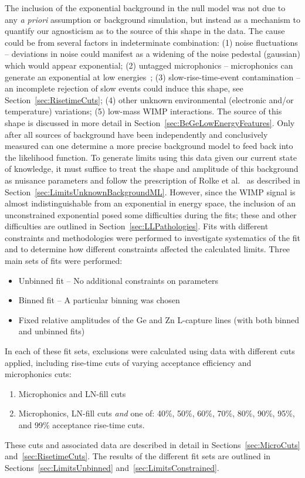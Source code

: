 The inclusion of the exponential background in the null model was not due to any \emph{a priori} assumption or background simulation, but instead as a mechanism to quantify our agnosticism as to the source of 
this shape in %
the data.  The cause could be from several factors in indeterminate combination: (1) noise fluctuations -- deviations in noise could manifest as a widening of the noise pedestal (gaussian) which would appear exponential; (2) untagged microphonics -- microphonics can generate an exponential at low energies~\cite{Morales1992410}; (3) slow-rise-time-event contamination -- an incomplete rejection of slow events could induce this shape, see Section~\ref{sec:RisetimeCuts}; (4) other unknown environmental (electronic and/or temperature) variations; (5) low-mass WIMP interactions.  The source of this shape is discussed in more detail in Section~\ref{sec:BeGeLowEnergyFeatures}.  Only after all sources of background have been independently and conclusively measured can one determine a more precise background model to feed back into the likelihood function.  To generate limits using this data given our current state of knowledge, it must suffice to treat the shape and amplitude of this background as nuisance parameters and follow the prescription of Rolke et al.~\cite{Rol05} as described in Section~\ref{sec:LimitsUnknownBackgroundML}.  However, since the WIMP signal is almost indistinguishable from an exponential in energy space, the inclusion of an unconstrained exponential posed some difficulties during the fits; these and other difficulties are outlined in Section~\ref{sec:LLPathologies}.
Fits with different constraints and methodologies were performed to investigate systematics of the fit and to determine how different constraints affected the calculated limits.  Three main sets of fits were performed:
		\begin{itemize}
			\item Unbinned fit -- No additional constraints on parameters
			\item Binned fit -- A particular binning was chosen
			\item Fixed relative amplitudes of the Ge and Zn L-capture lines (with both binned and unbinned fits)
		\end{itemize}			
In each of these fit sets, exclusions were calculated using data with different cuts applied, including rise-time cuts of varying acceptance efficiency and microphonics cuts:
	\begin{enumerate}	
		\item Microphonics and LN-fill cuts
		\item Microphonics, LN-fill cuts \emph{and} one of: 40\%, 50\%, 60\%, 70\%, 80\%, 90\%, 95\%, and 99\%
		acceptance rise-time cuts.
	\end{enumerate}
These cuts and associated data are described in detail in Sections~\ref{sec:MicroCuts} and~\ref{sec:RisetimeCuts}.  The results of the different fit sets are outlined in Sections~\ref{sec:LimitsUnbinned} and~\ref{sec:LimitsConstrained}.  

